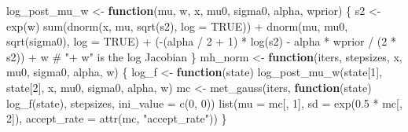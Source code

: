 \documentclass[
  letterpaper,
  DIV=11,
  numbers=noendperiod]{scrreprt}
\newenvironment{Shaded}{\begin{snugshade}}{\end{snugshade}}
\newcommand{\AttributeTok}[1]{\textcolor[rgb]{0.40,0.45,0.13}{#1}}
\newcommand{\CommentTok}[1]{\textcolor[rgb]{0.37,0.37,0.37}{#1}}
\newcommand{\ConstantTok}[1]{\textcolor[rgb]{0.56,0.35,0.01}{#1}}
\newcommand{\ControlFlowTok}[1]{\textcolor[rgb]{0.00,0.23,0.31}{\textbf{#1}}}
\newcommand{\DecValTok}[1]{\textcolor[rgb]{0.68,0.00,0.00}{#1}}
\newcommand{\FloatTok}[1]{\textcolor[rgb]{0.68,0.00,0.00}{#1}}
\newcommand{\FunctionTok}[1]{\textcolor[rgb]{0.28,0.35,0.67}{#1}}
\newcommand{\NormalTok}[1]{\textcolor[rgb]{0.00,0.23,0.31}{#1}}
\newcommand{\OtherTok}[1]{\textcolor[rgb]{0.00,0.23,0.31}{#1}}
\newcommand{\SpecialCharTok}[1]{\textcolor[rgb]{0.37,0.37,0.37}{#1}}
\newcommand{\StringTok}[1]{\textcolor[rgb]{0.13,0.47,0.30}{#1}}
\begin{document}
\begin{Shaded}
\begin{Highlighting}[]
\NormalTok{log\_post\_mu\_w }\OtherTok{\textless{}{-}} \ControlFlowTok{function}\NormalTok{(mu, w, x, mu0, sigma0, alpha, wprior) \{}
\NormalTok{    s2 }\OtherTok{\textless{}{-}} \FunctionTok{exp}\NormalTok{(w)}
    \FunctionTok{sum}\NormalTok{(}\FunctionTok{dnorm}\NormalTok{(x, mu, }\FunctionTok{sqrt}\NormalTok{(s2), }\AttributeTok{log =} \ConstantTok{TRUE}\NormalTok{)) }\SpecialCharTok{+} \FunctionTok{dnorm}\NormalTok{(mu, mu0, }\FunctionTok{sqrt}\NormalTok{(sigma0), }\AttributeTok{log =} \ConstantTok{TRUE}\NormalTok{) }\SpecialCharTok{+}
\NormalTok{        (}\SpecialCharTok{{-}}\NormalTok{(alpha }\SpecialCharTok{/} \DecValTok{2} \SpecialCharTok{+} \DecValTok{1}\NormalTok{) }\SpecialCharTok{*} \FunctionTok{log}\NormalTok{(s2) }\SpecialCharTok{{-}}\NormalTok{ alpha }\SpecialCharTok{*}\NormalTok{ wprior }\SpecialCharTok{/}\NormalTok{ (}\DecValTok{2} \SpecialCharTok{*}\NormalTok{ s2)) }\SpecialCharTok{+}\NormalTok{ w   }\CommentTok{\# "+ w" is the log Jacobian}
\NormalTok{\}}
\NormalTok{mh\_norm }\OtherTok{\textless{}{-}} \ControlFlowTok{function}\NormalTok{(iters, stepsizes, x, mu0, sigma0, alpha, w) \{}
\NormalTok{    log\_f }\OtherTok{\textless{}{-}} \ControlFlowTok{function}\NormalTok{(state) }\FunctionTok{log\_post\_mu\_w}\NormalTok{(state[}\DecValTok{1}\NormalTok{], state[}\DecValTok{2}\NormalTok{], x, mu0, sigma0, alpha, w)}
\NormalTok{    mc }\OtherTok{\textless{}{-}} \FunctionTok{met\_gauss}\NormalTok{(iters, }\ControlFlowTok{function}\NormalTok{(state) }\FunctionTok{log\_f}\NormalTok{(state), stepsizes, }\AttributeTok{ini\_value =} \FunctionTok{c}\NormalTok{(}\DecValTok{0}\NormalTok{, }\DecValTok{0}\NormalTok{))}
    \FunctionTok{list}\NormalTok{(}\AttributeTok{mu =}\NormalTok{ mc[, }\DecValTok{1}\NormalTok{], }\AttributeTok{sd =} \FunctionTok{exp}\NormalTok{(}\FloatTok{0.5} \SpecialCharTok{*}\NormalTok{ mc[, }\DecValTok{2}\NormalTok{]), }\AttributeTok{accept\_rate =} \FunctionTok{attr}\NormalTok{(mc, }\StringTok{"accept\_rate"}\NormalTok{))}
\NormalTok{\}}
\end{Highlighting}
\end{Shaded}
\end{document}
